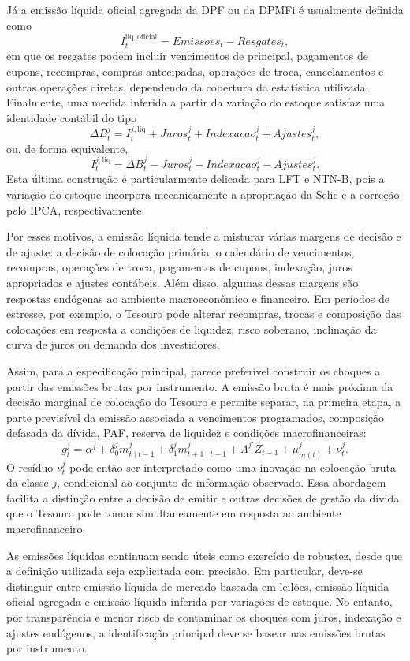 \documentclass[11pt,a4paper]{article}
\begin{document}
J\'a a emiss\~ao l\'iquida oficial agregada da DPF ou da DPMFi \'e usualmente definida como
\[
I_t^{\mathrm{liq,oficial}}
=
Emissoes_t
-
Resgates_t,
\]
em que os resgates podem incluir vencimentos de principal, pagamentos de cupons, recompras, compras antecipadas, opera\c{c}\~oes de troca, cancelamentos e outras opera\c{c}\~oes diretas, dependendo da cobertura da estat\'istica utilizada. Finalmente, uma medida inferida a partir da varia\c{c}\~ao do estoque satisfaz uma identidade cont\'abil do tipo
\[
\Delta B_t^j
=
I_t^{j,\mathrm{liq}}
+
Juros_t^j
+
Indexacao_t^j
+
Ajustes_t^j,
\]
ou, de forma equivalente,
\[
I_t^{j,\mathrm{liq}}
=
\Delta B_t^j
-
Juros_t^j
-
Indexacao_t^j
-
Ajustes_t^j.
\]
Esta \'ultima constru\c{c}\~ao \'e particularmente delicada para LFT e NTN-B, pois a varia\c{c}\~ao do estoque incorpora mecanicamente a apropria\c{c}\~ao da Selic e a corre\c{c}\~ao pelo IPCA, respectivamente.

Por esses motivos, a emiss\~ao l\'iquida tende a misturar v\'arias margens de decis\~ao e de ajuste: a decis\~ao de coloca\c{c}\~ao prim\'aria, o calend\'ario de vencimentos, recompras, opera\c{c}\~oes de troca, pagamentos de cupons, indexa\c{c}\~ao, juros apropriados e ajustes cont\'abeis. Al\'em disso, algumas dessas margens s\~ao respostas end\'ogenas ao ambiente macroecon\^omico e financeiro. Em per\'iodos de estresse, por exemplo, o Tesouro pode alterar recompras, trocas e composi\c{c}\~ao das coloca\c{c}\~oes em resposta a condi\c{c}\~oes de liquidez, risco soberano, inclina\c{c}\~ao da curva de juros ou demanda dos investidores.

Assim, para a especifica\c{c}\~ao principal, parece prefer\'ivel construir os choques a partir das emiss\~oes brutas por instrumento. A emiss\~ao bruta \'e mais pr\'oxima da decis\~ao marginal de coloca\c{c}\~ao do Tesouro e permite separar, na primeira etapa, a parte previs\'ivel da emiss\~ao associada a vencimentos programados, composi\c{c}\~ao defasada da d\'ivida, PAF, reserva de liquidez e condi\c{c}\~oes macrofinanceiras:
\[
g_t^j
=
\alpha^j
+
\delta_0^j m_{t\mid t-1}^j
+
\delta_1^j m_{t+1\mid t-1}^j
+
\Lambda^{j\prime}Z_{t-1}
+
\mu_{m(t)}^j
+
\nu_t^j.
\]
O res\'iduo \(\nu_t^j\) pode ent\~ao ser interpretado como uma inova\c{c}\~ao na coloca\c{c}\~ao bruta da classe \(j\), condicional ao conjunto de informa\c{c}\~ao observado. Essa abordagem facilita a distin\c{c}\~ao entre a decis\~ao de emitir e outras decis\~oes de gest\~ao da d\'ivida que o Tesouro pode tomar simultaneamente em resposta ao ambiente macrofinanceiro.

As emiss\~oes l\'iquidas continuam sendo úteis como exerc\'icio de robustez, desde que a defini\c{c}\~ao utilizada seja explicitada com precis\~ao. Em particular, deve-se distinguir entre emiss\~ao l\'iquida de mercado baseada em leil\~oes, emiss\~ao l\'iquida oficial agregada e emiss\~ao l\'iquida inferida por varia\c{c}\~oes de estoque. No entanto, por transpar\^encia e menor risco de contaminar os choques com juros, indexa\c{c}\~ao e ajustes end\'ogenos, a identifica\c{c}\~ao principal deve se basear nas emiss\~oes brutas por instrumento.
\end{document}
